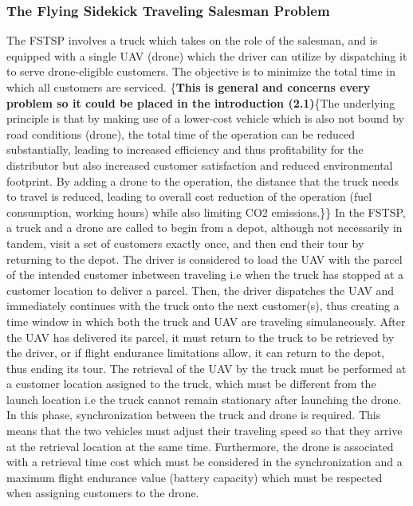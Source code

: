 \documentclass{article}
\begin{document}
	\subsubsection{The Flying Sidekick Traveling Salesman Problem} 
	The FSTSP involves a  truck which takes on the role of the salesman, and is equipped with a single UAV (drone) which the driver can utilize by dispatching it to serve drone-eligible customers. The objective is to minimize the total time in which all customers are serviced. \{\textbf{This is general and concerns every problem so it could be placed in the introduction (2.1)}\{The underlying principle is that by making use of a lower-cost vehicle which is also not bound by road conditions (drone), the total time of the operation can be reduced substantially, leading to increased efficiency and thus profitability for the distributor but also increased customer satisfaction and reduced environmental footprint. By adding a drone to the operation, the distance that the truck needs to travel is reduced, leading to overall cost reduction of the operation (fuel consumption, working hours) while also limiting CO2 emissions.\}\}
	In the FSTSP, a truck and a drone are called to begin from a depot, although not necessarily in tandem, visit a set of customers exactly once, and then end their tour by returning to the depot. The driver is considered to load the UAV with the parcel of the intended customer inbetween traveling i.e when the truck has stopped at a customer location to deliver a parcel. Then, the driver dispatches the UAV and immediately continues with the truck onto the next customer(s), thus creating a time window in which both the truck and UAV are traveling simulaneously. After the UAV has delivered its parcel, it must return to the truck to be retrieved by the driver, or if flight endurance limitations allow, it can return to the depot, thus ending its tour. The retrieval of the UAV by the truck must be performed at a customer location assigned to the truck, which must be different from the launch location i.e the truck cannot remain stationary after launching the drone. In this phase, synchronization between the truck and drone is required. This means that the two vehicles must adjust their traveling speed so that they arrive at the retrieval location at the same time. Furthermore, the drone is associated with a retrieval time cost which must be considered in the synchronization and a maximum flight endurance value (battery capacity) which must be respected when assigning customers to the drone.
	\par
\end{document}
